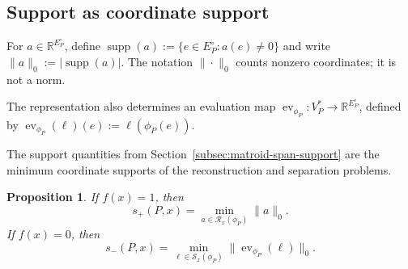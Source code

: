 \documentclass[11pt]{article}
\numberwithin{equation}{section}
\newtheorem{proposition}[definition]{Proposition}
\theoremstyle{remark}
\begin{document}
\subsection{Support as coordinate support}
\label{subsec:support-as-coordinate-support}

For $a\in\mathbb R^{E_P^\circ}$, define
$\operatorname{supp}(a):=\{e\in E_P^\circ:a(e)\neq0\}$ and write
$\|a\|_0:=|\operatorname{supp}(a)|$. The notation $\|\cdot\|_0$ counts
nonzero coordinates; it is not a norm.

The representation also determines an evaluation map
$\operatorname{ev}_{\phi_P}:V_P^*\to\mathbb R^{E_P^\circ}$, defined by
$\operatorname{ev}_{\phi_P}(\ell)(e):=\ell(\phi_P(e))$.

The support quantities from Section~\ref{subsec:matroid-span-support} are the minimum coordinate supports of the reconstruction and separation problems.

\begin{proposition}
\label{prop:support-linear-characterization}
If $f(x)=1$, then
\begin{equation}
    s_+(P,x)
    =
    \min_{a\in\mathcal R_x(\phi_P)}
        \|a\|_0.
\end{equation}
If $f(x)=0$, then
\begin{equation}
    s_-(P,x)
    =
    \min_{\ell\in\mathcal S_x(\phi_P)}
        \|\operatorname{ev}_{\phi_P}(\ell)\|_0.
\end{equation}
\end{proposition}
\end{document}
